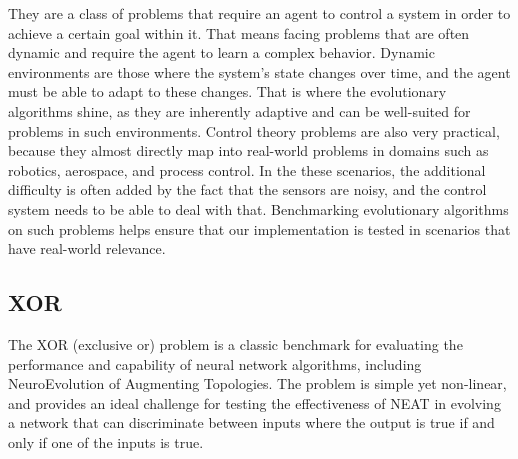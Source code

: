 \documentclass{article}
\begin{document}
    They are a class of problems that require an agent to control a system in order to achieve
    a certain goal within it.
    That means facing problems that are often dynamic and require the agent to learn a complex behavior. 
    Dynamic environments are those where the system's state changes over time, and the agent must be able to adapt to these changes.
    That is where the evolutionary algorithms shine, as they are inherently adaptive and can be well-suited for problems in such environments.
    Control theory problems are also very practical, because they almost directly map into real-world problems in domains such as robotics,
    aerospace, and process control. In the these scenarios, the additional difficulty is often added by the fact
    that the sensors are noisy, and the control system needs to be able to deal with that. 
    Benchmarking evolutionary algorithms on such problems helps ensure that our implementation
    is tested in scenarios that have real-world relevance.
    
        \subsection{XOR}
        The XOR (exclusive or) problem is a classic benchmark for evaluating the performance and capability of neural network algorithms,
        including NeuroEvolution of Augmenting Topologies.
        The problem is simple yet non-linear, and provides an ideal challenge for testing the effectiveness of NEAT in evolving
        a network that can discriminate between inputs where the output is true if and only if one of the inputs is true.

\begin{table}[H]
    \end{table}
\end{document}
